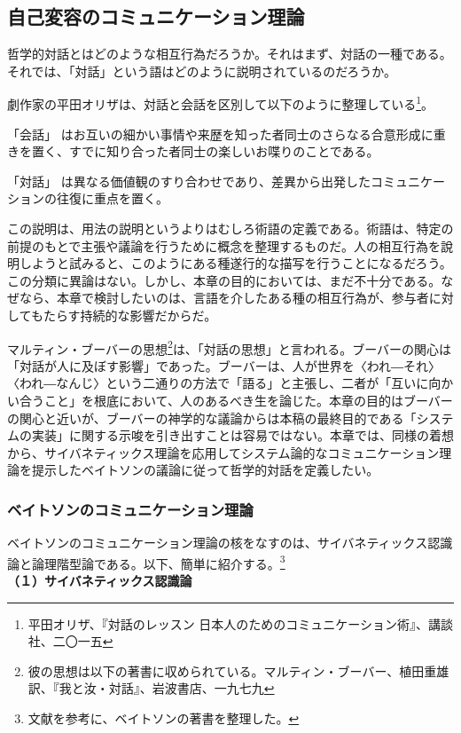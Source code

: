 \documentclass[b5j,twoside,twocolumn]{utarticle}
\begin{document}
\subsection{自己変容のコミュニケーション理論}
哲学的対話とはどのような相互行為だろうか。それはまず、対話の一種である。それでは、「対話」という語はどのように説明されているのだろうか。


劇作家の平田オリザは、対話と会話を区別して以下のように整理している\footnote{平田オリザ、『対話のレッスン 日本人のためのコミュニケーション術』、講談社、二〇一五}。
\begin{description}
\item{「会話」} はお互いの細かい事情や来歴を知った者同士のさらなる合意形成に重きを置く、すでに知り合った者同士の楽しいお喋りのことである。
\item{「対話」} は異なる価値観のすり合わせであり、差異から出発したコミュニケーションの往復に重点を置く。
\end{description}
この説明は、用法の説明というよりはむしろ術語の定義である。術語は、特定の前提のもとで主張や議論を行うために概念を整理するものだ。人の相互行為を說明しようと試みると、このようにある種遂行的な描写を行うことになるだろう。
この分類に異論はない。しかし、本章の目的においては、まだ不十分である。なぜなら、本章で検討したいのは、言語を介したある種の相互行為が、参与者に対してもたらす持続的な影響だからだ。


マルティン・ブーバーの思想\footnote{彼の思想は以下の著書に収められている。マルティン・ブーバー、植田重雄訳、『我と汝・対話』、岩波書店、一九七九}は、「対話の思想」と言われる。ブーバーの関心は「対話が人に及ぼす影響」であった。ブーバーは、人が世界を〈われ―それ〉〈われ―なんじ〉という二通りの方法で「語る」と主張し、二者が「互いに向かい合うこと」を根底において、人のあるべき生を論じた。本章の目的はブーバーの関心と近いが、ブーバーの神学的な議論からは本稿の最終目的である「システムの実装」に関する示唆を引き出すことは容易ではない。本章では、同様の着想から、サイバネティックス理論を応用してシステム論的なコミュニケーション理論を提示したベイトソンの議論に従って哲学的対話を定義したい。


\subsubsection*{ベイトソンのコミュニケーション理論}
ベイトソンのコミュニケーション理論の核をなすのは、サイバネティックス認識論と論理階型論である。以下、簡単に紹介する。\footnote{文献\cite{JIKO}を参考に、ベイトソンの著書\cite{SEM}を整理した。} \\
\textbf{（１）サイバネティックス認識論}
\end{document}
